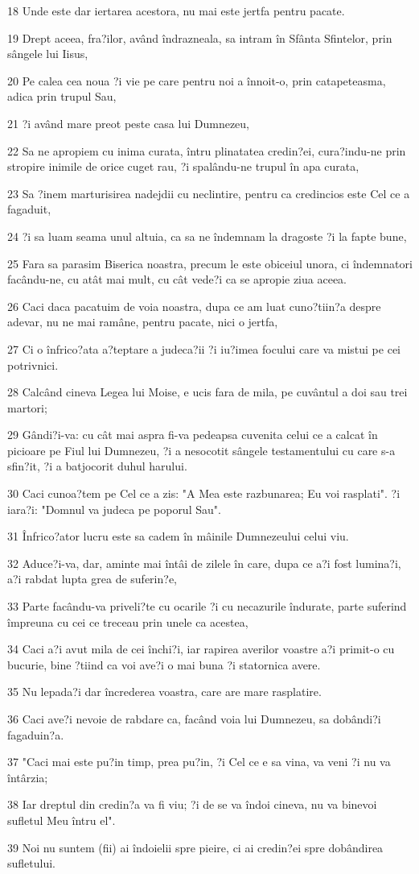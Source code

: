 \par 18 Unde este dar iertarea acestora, nu mai este jertfa pentru pacate.
\par 19 Drept aceea, fra?ilor, având îndrazneala, sa intram în Sfânta Sfintelor, prin sângele lui Iisus,
\par 20 Pe calea cea noua ?i vie pe care pentru noi a înnoit-o, prin catapeteasma, adica prin trupul Sau,
\par 21 ?i având mare preot peste casa lui Dumnezeu,
\par 22 Sa ne apropiem cu inima curata, întru plinatatea credin?ei, cura?indu-ne prin stropire inimile de orice cuget rau, ?i spalându-ne trupul în apa curata,
\par 23 Sa ?inem marturisirea nadejdii cu neclintire, pentru ca credincios este Cel ce a fagaduit,
\par 24 ?i sa luam seama unul altuia, ca sa ne îndemnam la dragoste ?i la fapte bune,
\par 25 Fara sa parasim Biserica noastra, precum le este obiceiul unora, ci îndemnatori facându-ne, cu atât mai mult, cu cât vede?i ca se apropie ziua aceea.
\par 26 Caci daca pacatuim de voia noastra, dupa ce am luat cuno?tiin?a despre adevar, nu ne mai ramâne, pentru pacate, nici o jertfa,
\par 27 Ci o înfrico?ata a?teptare a judeca?ii ?i iu?imea focului care va mistui pe cei potrivnici.
\par 28 Calcând cineva Legea lui Moise, e ucis fara de mila, pe cuvântul a doi sau trei martori;
\par 29 Gândi?i-va: cu cât mai aspra fi-va pedeapsa cuvenita celui ce a calcat în picioare pe Fiul lui Dumnezeu, ?i a nesocotit sângele testamentului cu care s-a sfin?it, ?i a batjocorit duhul harului.
\par 30 Caci cunoa?tem pe Cel ce a zis: "A Mea este razbunarea; Eu voi rasplati". ?i iara?i: "Domnul va judeca pe poporul Sau".
\par 31 Înfrico?ator lucru este sa cadem în mâinile Dumnezeului celui viu.
\par 32 Aduce?i-va, dar, aminte mai întâi de zilele în care, dupa ce a?i fost lumina?i, a?i rabdat lupta grea de suferin?e,
\par 33 Parte facându-va priveli?te cu ocarile ?i cu necazurile îndurate, parte suferind împreuna cu cei ce treceau prin unele ca acestea,
\par 34 Caci a?i avut mila de cei închi?i, iar rapirea averilor voastre a?i primit-o cu bucurie, bine ?tiind ca voi ave?i o mai buna ?i statornica avere.
\par 35 Nu lepada?i dar încrederea voastra, care are mare rasplatire.
\par 36 Caci ave?i nevoie de rabdare ca, facând voia lui Dumnezeu, sa dobândi?i fagaduin?a.
\par 37 "Caci mai este pu?in timp, prea pu?in, ?i Cel ce e sa vina, va veni ?i nu va întârzia;
\par 38 Iar dreptul din credin?a va fi viu; ?i de se va îndoi cineva, nu va binevoi sufletul Meu întru el".
\par 39 Noi nu suntem (fii) ai îndoielii spre pieire, ci ai credin?ei spre dobândirea sufletului.

